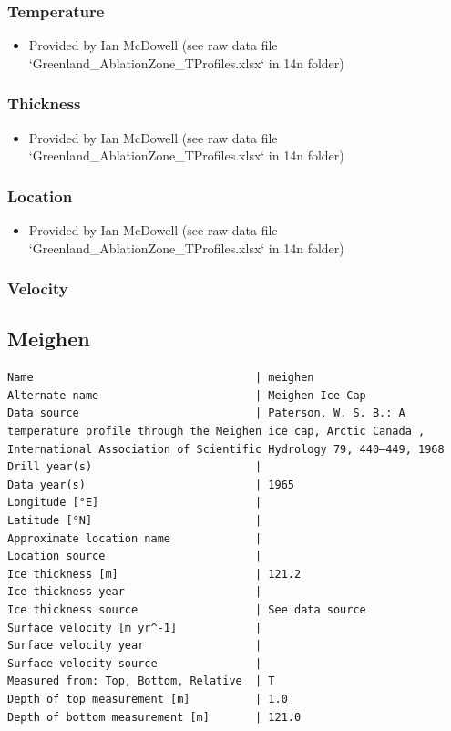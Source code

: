 \documentclass[article,a4paper,times,11pt,twoside]{article}
\begin{document}
\subsubsection{Temperature}
\label{sec:org5ed8854}

\begin{itemize}
\item Provided by Ian McDowell (see raw data file `Greenland\_AblationZone\_TProfiles.xlsx` in 14n folder)
\end{itemize}

\subsubsection{Thickness}
\label{sec:orgec8222c}

\begin{itemize}
\item Provided by Ian McDowell (see raw data file `Greenland\_AblationZone\_TProfiles.xlsx` in 14n folder)
\end{itemize}

\subsubsection{Location}
\label{sec:org8da5f97}

\begin{itemize}
\item Provided by Ian McDowell (see raw data file `Greenland\_AblationZone\_TProfiles.xlsx` in 14n folder)
\end{itemize}

\subsubsection{Velocity}
\label{sec:org4cbdeea}
\clearpage
\subsection{Meighen}
\label{sec:orgd1a8df6}
\begin{verbatim}
Name                                  | meighen
Alternate name                        | Meighen Ice Cap
Data source                           | Paterson, W. S. B.: A temperature profile through the Meighen ice cap, Arctic Canada , International Association of Scientific Hydrology 79, 440–449, 1968 
Drill year(s)                         | 
Data year(s)                          | 1965
Longitude [°E]                        | 
Latitude [°N]                         | 
Approximate location name             | 
Location source                       | 
Ice thickness [m]                     | 121.2
Ice thickness year                    | 
Ice thickness source                  | See data source
Surface velocity [m yr^-1]            | 
Surface velocity year                 | 
Surface velocity source               | 
Measured from: Top, Bottom, Relative  | T
Depth of top measurement [m]          | 1.0
Depth of bottom measurement [m]       | 121.0
\end{verbatim}
\end{document}
